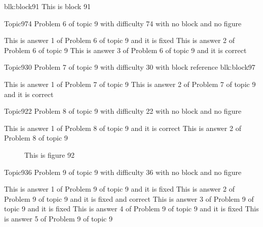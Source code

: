 \documentclass[master]{exam}
\begin{document}
\begin{block}{blk:block91}
This is block 91
\end{block}


\begin{problem}{Topic9}{74}
	Problem 6 of topic 9 with difficulty 74 with no block and no figure
	\begin{answers}
		\answer[fixed] This is answer 1 of Problem 6 of topic 9 and it is fixed
		\answer This is answer 2 of Problem 6 of topic 9 
		\answer[correct] This is answer 3 of Problem 6 of topic 9 and it is correct
	\end{answers}
\end{problem}

\begin{problem}[requires=blk:block97]{Topic9}{30}
	Problem 7 of topic 9 with difficulty 30 with block reference blk:block97
	\begin{answers}
		\answer This is answer 1 of Problem 7 of topic 9 
		\answer[correct] This is answer 2 of Problem 7 of topic 9 and it is correct
	\end{answers}
\end{problem}

\begin{problem}{Topic9}{22}
	Problem 8 of topic 9 with difficulty 22 with no block and no figure
	\begin{answers}
		\answer[correct] This is answer 1 of Problem 8 of topic 9 and it is correct
		\answer This is answer 2 of Problem 8 of topic 9 
	\end{answers}
\end{problem}



\begin{figure}
	\begin{center}
		This is figure 92 
		\label{fig:figure92}
	\end{center}
\end{figure}

\begin{problem}{Topic9}{36}
	Problem 9 of topic 9 with difficulty 36 with no block and no figure
	\begin{answers}
		\answer[fixed] This is answer 1 of Problem 9 of topic 9 and it is fixed
		 This is answer 2 of Problem 9 of topic 9 and it is fixed and correct
		\answer[fixed] This is answer 3 of Problem 9 of topic 9 and it is fixed
		\answer[fixed] This is answer 4 of Problem 9 of topic 9 and it is fixed
		\answer This is answer 5 of Problem 9 of topic 9 
	\end{answers}
\end{problem}
\end{document}
